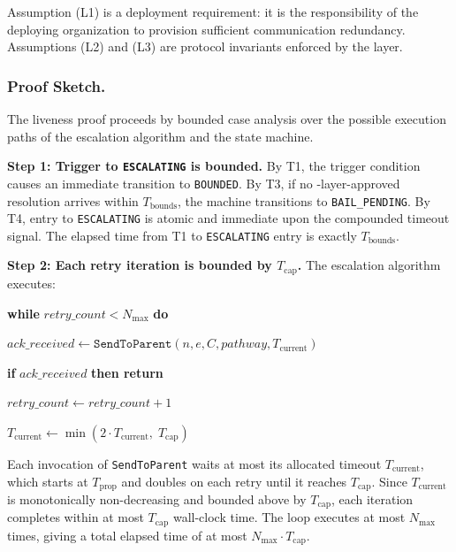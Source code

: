 Assumption (L1) is a deployment requirement: it is the responsibility of the deploying organization to provision sufficient communication redundancy. Assumptions (L2) and (L3) are protocol invariants enforced by the \fact{} layer.

\subsubsection{Proof Sketch.}

The liveness proof proceeds by bounded case analysis over the possible execution paths of the escalation algorithm and the state machine.

\medskip
\noindent\textbf{Step 1: Trigger to \texttt{ESCALATING} is bounded.} By T1, the trigger condition causes an immediate transition to \texttt{BOUNDED}. By T3, if no \fact-layer-approved resolution arrives within $T_{\text{bounds}}$, the machine transitions to \texttt{BAIL\_PENDING}. By T4, entry to \texttt{ESCALATING} is atomic and immediate upon the compounded timeout signal. The elapsed time from T1 to \texttt{ESCALATING} entry is exactly $T_{\text{bounds}}$.

\medskip
\noindent\textbf{Step 2: Each retry iteration is bounded by $T_{\text{cap}}$.} The escalation algorithm executes:
\begin{trivlist}\itemsep=0pt
\item[]\textbf{while} $retry\_count < N_{\max}$ \textbf{do}
\item[]\hspace{1em}$ack\_received \leftarrow \texttt{SendToParent}(n, e, C, pathway, T_{\text{current}})$
\item[]\hspace{1em}\textbf{if} $ack\_received$ \textbf{then return}
\item[]\hspace{1em}$retry\_count \leftarrow retry\_count + 1$
\item[]\hspace{1em}$T_{\text{current}} \leftarrow \min(2 \cdot T_{\text{current}},\; T_{\text{cap}})$
\end{trivlist}
Each invocation of \texttt{SendToParent} waits at most its allocated timeout $T_{\text{current}}$, which starts at $T_{\text{prop}}$ and doubles on each retry until it reaches $T_{\text{cap}}$. Since $T_{\text{current}}$ is monotonically non-decreasing and bounded above by $T_{\text{cap}}$, each iteration completes within at most $T_{\text{cap}}$ wall-clock time. The loop executes at most $N_{\max}$ times, giving a total elapsed time of at most $N_{\max} \cdot T_{\text{cap}}$.

